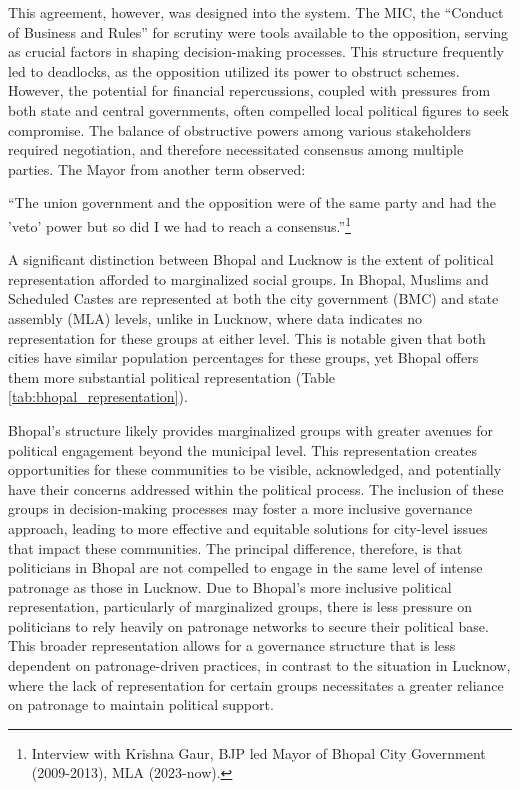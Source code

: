 This agreement, however, was designed into the system. The MIC, the ``Conduct of Business and Rules'' for scrutiny were tools available to the opposition, serving as crucial factors in shaping decision-making processes. This structure frequently led to deadlocks, as the opposition utilized its power to obstruct schemes. However, the potential for financial repercussions, coupled with pressures from both state and central governments, often compelled local political figures to seek compromise. The balance of obstructive powers among various stakeholders required negotiation, and therefore necessitated consensus among multiple parties. The Mayor from another term observed:

``The union government and the opposition were of the same party and had the 'veto' power but so did I we had to reach a consensus.''\footnote{Interview with Krishna Gaur, BJP led Mayor of Bhopal City Government (2009-2013), MLA (2023-now).}

A significant distinction between Bhopal and Lucknow is the extent of political representation afforded to marginalized social groups. In Bhopal, Muslims and Scheduled Castes are represented at both the city government (BMC) and state assembly (MLA) levels, unlike in Lucknow, where data indicates no representation for these groups at either level. This is notable given that both cities have similar population percentages for these groups, yet Bhopal offers them more substantial political representation (Table \ref{tab:bhopal_representation}).

Bhopal's structure likely provides marginalized groups with greater avenues for political engagement beyond the municipal level. This representation creates opportunities for these communities to be visible, acknowledged, and potentially have their concerns addressed within the political process. The inclusion of these groups in decision-making processes may foster a more inclusive governance approach, leading to more effective and equitable solutions for city-level issues that impact these communities. The principal difference, therefore, is that politicians in Bhopal are not compelled to engage in the same level of intense patronage as those in Lucknow. Due to Bhopal's more inclusive political representation, particularly of marginalized groups, there is less pressure on politicians to rely heavily on patronage networks to secure their political base. This broader representation allows for a governance structure that is less dependent on patronage-driven practices, in contrast to the situation in Lucknow, where the lack of representation for certain groups necessitates a greater reliance on patronage to maintain political support.

